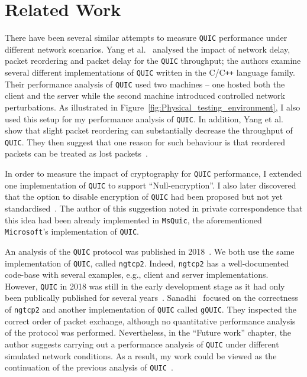 \documentclass[12pt,a4paper]{report}
\begin{document}
\section{Related Work}
There have been several similar attempts to measure \texttt{QUIC} performance under different network scenarios. 
Yang et al.~\cite{Making_QUIC_Quicker} analysed the impact of network delay, packet reordering and packet delay for the \texttt{QUIC} throughput; the authors examine several different implementations of \texttt{QUIC} written in the C/C\texttt{++} language family.
Their performance analysis of \texttt{QUIC} used two machines -- one hosted both the client and the server while the second machine introduced controlled network perturbations.
As illustrated in Figure~\ref{fig:Physical_testing_environment}, I also used this setup for my performance analysis of \texttt{QUIC}.
In addition, Yang et al.~\cite{Making_QUIC_Quicker} show that slight packet reordering can substantially decrease the throughput of \texttt{QUIC}.
They then suggest that one reason for such behaviour is that reordered packets can be treated as lost packets~\cite{Making_QUIC_Quicker}. 


In order to measure the impact of cryptography for \texttt{QUIC} performance, I extended one implementation of \texttt{QUIC} to support \enquote{Null-encryption}.
I also later discovered that the option to disable encryption of \texttt{QUIC} had been proposed but not yet standardised~\cite{banks-quic-disable-encryption-00}.
The author of this suggestion noted in private correspondence that this idea had been already implemented in \texttt{MsQuic}, the aforementioned \texttt{Microsoft}'s implementation of \texttt{QUIC}.



An analysis of the \texttt{QUIC} protocol was published in 2018~\cite{overview_of_the_QUIC_protocol}.
We both use the same implementation of \texttt{QUIC}, called \texttt{ngtcp2}.
Indeed, \texttt{ngtcp2} has a well-documented code-base with several examples, e.g., client and server implementations.   
However, \texttt{QUIC} in 2018 was still in the early development stage as it had only been publically published for several years~\cite{Chromium_Blog_Experimenting_with_quic}.
Sanadhi~\cite{overview_of_the_QUIC_protocol} focused on the correctness of \texttt{ngtcp2} and another implementation of \texttt{QUIC} called \texttt{gQUIC}.
They inspected the correct order of packet exchange, although no quantitative performance analysis of the protocol was performed.
Nevertheless, in the \enquote{Future work} chapter, the author suggests carrying out a performance analysis of \texttt{QUIC} under different simulated network conditions.
As a result, my work could be viewed as the continuation of the previous analysis of \texttt{QUIC}~\cite{overview_of_the_QUIC_protocol}.
\end{document}
